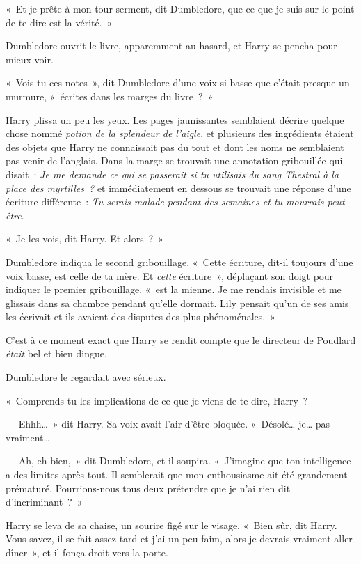 «~Et je prête à mon tour serment, dit Dumbledore, que ce que je suis sur le point de te dire est la vérité.~»

Dumbledore ouvrit le livre, apparemment au hasard, et Harry se pencha pour mieux voir.

«~Vois-tu ces notes~», dit Dumbledore d'une voix si basse que c'était presque un murmure, «~écrites dans les marges du livre~?~»

Harry plissa un peu les yeux. Les pages jaunissantes semblaient décrire quelque chose nommé \emph{potion de la splendeur de l'aigle}, et plusieurs des ingrédients étaient des objets que Harry ne connaissait pas du tout et dont les noms ne semblaient pas venir de l'anglais. Dans la marge se trouvait une annotation gribouillée qui disait~: \emph{Je me demande ce qui se passerait si tu utilisais du sang Thestral à la place des myrtilles~?} et immédiatement en dessous se trouvait une réponse d'une écriture différente~: \emph{Tu serais malade pendant des semaines et tu mourrais peut-être}.

«~Je les vois, dit Harry. Et alors~?~»

Dumbledore indiqua le second gribouillage. «~Cette écriture, dit-il toujours d'une voix basse, est celle de ta mère. Et \emph{cette} écriture~», déplaçant son doigt pour indiquer le premier gribouillage, «~est la mienne. Je me rendais invisible et me glissais dans sa chambre pendant qu'elle dormait. Lily pensait qu'un de ses amis les écrivait et ils avaient des disputes des plus phénoménales.~»

C'est à ce moment exact que Harry se rendit compte que le directeur de Poudlard \emph{était} bel et bien dingue.

Dumbledore le regardait avec sérieux.

«~Comprends-tu les implications de ce que je viens de te dire, Harry~?

--- Ehhh…~» dit Harry. Sa voix avait l'air d'être bloquée. «~Désolé… je… pas vraiment…

--- Ah, eh bien,~» dit Dumbledore, et il soupira. «~J'imagine que ton intelligence a des limites après tout. Il semblerait que mon enthousiasme ait été grandement prématuré. Pourrions-nous tous deux prétendre que je n'ai rien dit d'incriminant~?~»

Harry se leva de sa chaise, un sourire figé sur le visage. «~Bien sûr, dit Harry. Vous savez, il se fait assez tard et j'ai un peu faim, alors je devrais vraiment aller dîner~», et il fonça droit vers la porte.

